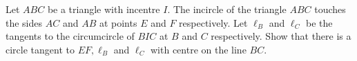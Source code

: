 Let $ABC$ be a triangle with incentre $I$. The incircle of the triangle $ABC$ touches the sides $AC$ and $AB$ at points $E$ and $F$ respectively. Let $\ell_B$ and $\ell_C$ be the tangents to the circumcircle of $BIC$ at $B$ and $C$ respectively. Show that there is a circle tangent to $EF, \ell_B$ and $\ell_C$ with centre on the line $BC$.